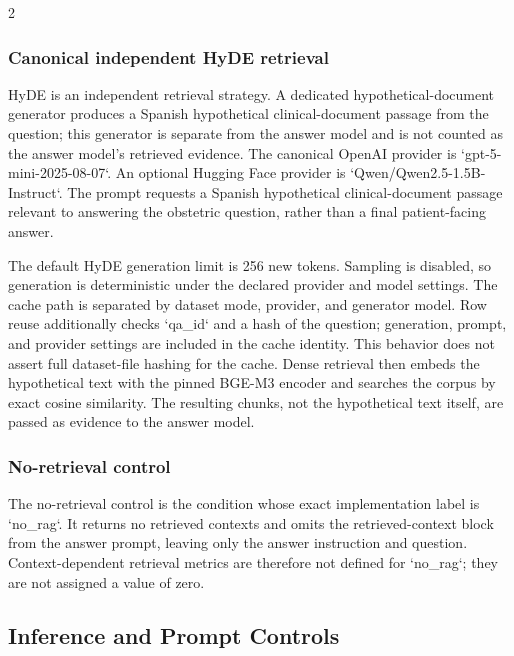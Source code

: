 \documentclass[11pt]{article}
\begin{document}
\begin{multicols}{2}
\subsubsection{Canonical independent HyDE retrieval}

HyDE is an independent retrieval strategy. A dedicated hypothetical-document generator produces a Spanish hypothetical clinical-document passage from the question; this generator is separate from the answer model and is not counted as the answer model's retrieved evidence. The canonical OpenAI provider is `gpt-5-mini-2025-08-07`. An optional Hugging Face provider is `Qwen/Qwen2.5-1.5B-Instruct`. The prompt requests a Spanish hypothetical clinical-document passage relevant to answering the obstetric question, rather than a final patient-facing answer.

The default HyDE generation limit is 256 new tokens. Sampling is disabled, so generation is deterministic under the declared provider and model settings. The cache path is separated by dataset mode, provider, and generator model. Row reuse additionally checks `qa\_id` and a hash of the question; generation, prompt, and provider settings are included in the cache identity. This behavior does not assert full dataset-file hashing for the cache. Dense retrieval then embeds the hypothetical text with the pinned BGE-M3 encoder and searches the corpus by exact cosine similarity. The resulting chunks, not the hypothetical text itself, are passed as evidence to the answer model.

\subsubsection{No-retrieval control}

The no-retrieval control is the condition whose exact implementation label is `no\_rag`. It returns no retrieved contexts and omits the retrieved-context block from the answer prompt, leaving only the answer instruction and question. Context-dependent retrieval metrics are therefore not defined for `no\_rag`; they are not assigned a value of zero.

\subsection{Inference and Prompt Controls}


\end{multicols}
\end{document}
